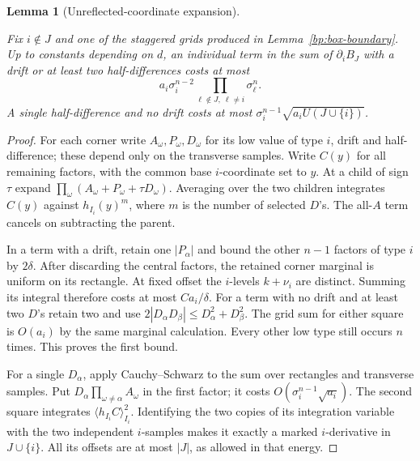 \documentclass[11pt,letterpaper]{article}
\newtheorem{lemma}[theorem]{Lemma}
\theoremstyle{definition}
\newcommand{\avg}[2]{\langle #1\rangle_{#2}}
\providecommand{\lean}[1]{}
\providecommand{\uses}[1]{}
\begin{document}
\begin{lemma}[Unreflected-coordinate expansion]\label{bp:box-expand}
\lean{TwistedParaproduct.boxExpand}
Fix \(i\notin J\) and one of the staggered grids produced in
Lemma~\ref{bp:box-boundary}. Up to constants depending on \(d\), an
individual term in the sum of \(\partial_i B_J\) with a drift or at
least two half-differences costs at most
\[
    a_i\sigma_i^{n-2}\prod_{\ell\notin J,\ \ell\ne i}\sigma_\ell^n.
\]
A single half-difference and no drift costs at most
\(\sigma_i^{n-1}\sqrt{a_i U(J\cup\{i\})}\).
\end{lemma}
\begin{proof}
\uses{bp:energy-def,bp:marginal,bp:residual-drift,bp:box-square,bp:box-boundary}
For each corner write \(A_\omega,P_\omega,D_\omega\) for its low
value of type \(i\), drift and half-difference; these depend only on
the transverse samples. Write \(C(y)\) for all remaining factors,
with the common base \(i\)-coordinate set to \(y\). At a child of
sign \(\tau\) expand \(\prod_\omega(A_\omega+P_\omega+\tau D_\omega)\).
Averaging over the two children integrates \(C(y)\) against
\(h_{I_i}(y)^m\), where \(m\) is the number of selected \(D\)'s.
The all-\(A\) term cancels on subtracting the parent.

In a term with a drift, retain one \(|P_\alpha|\) and bound the other
\(n-1\) factors of type \(i\) by \(2\delta\). After discarding the
central factors, the retained corner marginal is uniform on its
rectangle. At fixed offset the \(i\)-levels \(k+\nu_i\) are distinct.
Summing its integral therefore costs at most \(C a_i/\delta\).
For a term with no drift and at least two \(D\)'s retain two and use
\(2|D_\alpha D_\beta|\le D_\alpha^2+D_\beta^2\). The grid sum for
either square is \(O(a_i)\) by the same marginal calculation.
Every other low type still occurs \(n\) times. This proves the first
bound.

For a single \(D_\alpha\), apply Cauchy--Schwarz to the sum over
rectangles and transverse samples. Put \(D_\alpha\prod_{\omega\ne\alpha}
A_\omega\) in the first factor; it costs
\(O(\sigma_i^{n-1}\sqrt{a_i})\). The second square integrates
\(\avg{h_{I_i}C}{I_i}^2\). Identifying the two copies of its integration
variable with the two independent \(i\)-samples makes it exactly a
marked \(i\)-derivative in \(J\cup\{i\}\). All its offsets are at most
\(|J|\), as allowed in that energy.
\end{proof}
\end{document}
